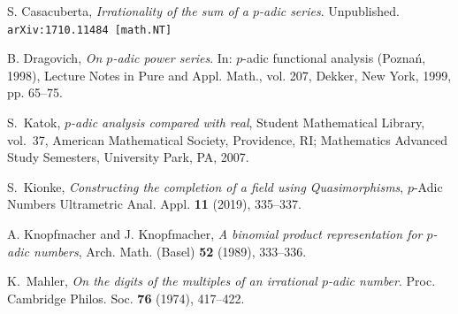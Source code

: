 \let\oldaddcontentsline\addcontentsline
\renewcommand{\addcontentsline}[3]{}
\begin{thebibliography}{11}

 S. Casacuberta, 
\emph{Irrationality of the sum of a $p$-adic series}. Unpublished. \texttt{arXiv:1710.11484 [math.NT]}

 B. Dragovich,
\emph{On $p$-adic power series}. In: $p$-adic functional analysis (Poznań, 1998), Lecture Notes in Pure and Appl. Math., vol. 207, Dekker, New York, 1999, pp. 65--75. 

 S.~Katok, \emph{{$p$}-adic analysis compared with real}, Student Mathematical Library, vol.~37, American Mathematical Society, Providence, RI; Mathematics Advanced Study Semesters, University Park, PA, 2007. 

 S.~Kionke, \emph{Constructing the completion of a field using Quasimorphisms}, 
$p$-Adic Numbers Ultrametric Anal. Appl. \textbf{11} (2019), 335--337.

 A. Knopfmacher and J. Knopfmacher, \emph{A binomial product representation for $p$-adic numbers},
Arch. Math. (Basel) \textbf{52} (1989), 333--336.

 K.~Mahler,
\emph{On the digits of the multiples of an irrational $p$-adic number}.
Proc. Cambridge Philos. Soc. 
\textbf{76} (1974), 417--422.

\end{thebibliography}

\let\addcontentsline\oldaddcontentsline
